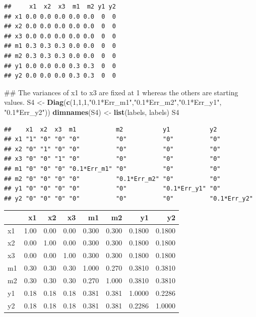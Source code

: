 \documentclass[]{article}
\newenvironment{Shaded}{\begin{snugshade}}{\end{snugshade}}
\newcommand{\KeywordTok}[1]{\textcolor[rgb]{0.13,0.29,0.53}{\textbf{#1}}}
\newcommand{\DataTypeTok}[1]{\textcolor[rgb]{0.13,0.29,0.53}{#1}}
\newcommand{\DecValTok}[1]{\textcolor[rgb]{0.00,0.00,0.81}{#1}}
\newcommand{\StringTok}[1]{\textcolor[rgb]{0.31,0.60,0.02}{#1}}
\newcommand{\OperatorTok}[1]{\textcolor[rgb]{0.81,0.36,0.00}{\textbf{#1}}}
\newcommand{\NormalTok}[1]{#1}
\begin{document}
\begin{verbatim}
##     x1  x2  x3  m1  m2 y1 y2
## x1 0.0 0.0 0.0 0.0 0.0  0  0
## x2 0.0 0.0 0.0 0.0 0.0  0  0
## x3 0.0 0.0 0.0 0.0 0.0  0  0
## m1 0.3 0.3 0.3 0.0 0.0  0  0
## m2 0.3 0.3 0.3 0.0 0.0  0  0
## y1 0.0 0.0 0.0 0.3 0.3  0  0
## y2 0.0 0.0 0.0 0.3 0.3  0  0
\end{verbatim}

\begin{Shaded}
\begin{Highlighting}[]
\NormalTok{## The variances of x1 to x3 are fixed at 1 whereas the others are starting values.}
\NormalTok{S4 <-}\StringTok{ }\KeywordTok{Diag}\NormalTok{(}\KeywordTok{c}\NormalTok{(}\DecValTok{1}\NormalTok{,}\DecValTok{1}\NormalTok{,}\DecValTok{1}\NormalTok{,}\StringTok{"0.1*Err_m1"}\NormalTok{,}\StringTok{"0.1*Err_m2"}\NormalTok{,}\StringTok{"0.1*Err_y1"}\NormalTok{, }\StringTok{"0.1*Err_y2"}\NormalTok{))}
\KeywordTok{dimnames}\NormalTok{(S4) <-}\StringTok{ }\KeywordTok{list}\NormalTok{(labels, labels)}
\NormalTok{S4}
\end{Highlighting}
\end{Shaded}

\begin{verbatim}
##    x1  x2  x3  m1           m2           y1           y2          
## x1 "1" "0" "0" "0"          "0"          "0"          "0"         
## x2 "0" "1" "0" "0"          "0"          "0"          "0"         
## x3 "0" "0" "1" "0"          "0"          "0"          "0"         
## m1 "0" "0" "0" "0.1*Err_m1" "0"          "0"          "0"         
## m2 "0" "0" "0" "0"          "0.1*Err_m2" "0"          "0"         
## y1 "0" "0" "0" "0"          "0"          "0.1*Err_y1" "0"         
## y2 "0" "0" "0" "0"          "0"          "0"          "0.1*Err_y2"
\end{verbatim}

\begin{Shaded}
\end{Shaded}

\begin{longtable}[]{@{}lrrrrrrr@{}}
\toprule
& x1 & x2 & x3 & m1 & m2 & y1 & y2\tabularnewline
\midrule
\endhead
x1 & 1.00 & 0.00 & 0.00 & 0.300 & 0.300 & 0.1800 & 0.1800\tabularnewline
x2 & 0.00 & 1.00 & 0.00 & 0.300 & 0.300 & 0.1800 & 0.1800\tabularnewline
x3 & 0.00 & 0.00 & 1.00 & 0.300 & 0.300 & 0.1800 & 0.1800\tabularnewline
m1 & 0.30 & 0.30 & 0.30 & 1.000 & 0.270 & 0.3810 & 0.3810\tabularnewline
m2 & 0.30 & 0.30 & 0.30 & 0.270 & 1.000 & 0.3810 & 0.3810\tabularnewline
y1 & 0.18 & 0.18 & 0.18 & 0.381 & 0.381 & 1.0000 & 0.2286\tabularnewline
y2 & 0.18 & 0.18 & 0.18 & 0.381 & 0.381 & 0.2286 & 1.0000\tabularnewline
\bottomrule
\end{longtable}
\end{document}
